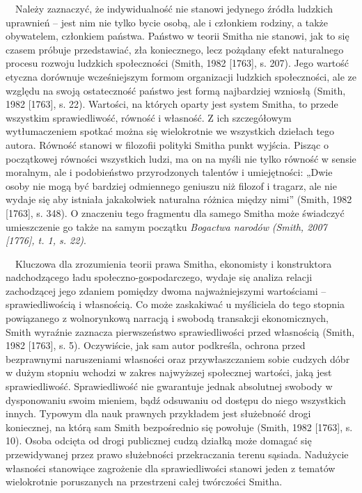 \documentclass[a4paper]{article}
\begin{document}
 \ \ Należy zaznaczyć, że indywidualność nie stanowi jedynego źródła ludzkich uprawnień – jest nim nie tylko bycie
osobą, ale i członkiem rodziny, a także obywatelem, członkiem państwa. Państwo w teorii Smitha nie stanowi, jak to się
czasem próbuje przedstawiać, zła koniecznego, lecz pożądany efekt naturalnego procesu rozwoju ludzkich społeczności
\label{ref:RNDLLHqgagP0f}(Smith, 1982 [1763], s. 207). Jego wartość etyczna dorównuje wcześniejszym formom organizacji
ludzkich społeczności, ale ze względu na swoją ostateczność państwo jest formą najbardziej wzniosłą
\label{ref:RNDKABNqSVWe4}(Smith, 1982 [1763], s. 22). Wartości, na których oparty jest system Smitha, to przede
wszystkim sprawiedliwość, równość i własność. Z ich szczegółowym wytłumaczeniem spotkać można się wielokrotnie we
wszystkich dziełach tego autora. Równość stanowi w filozofii polityki Smitha punkt wyjścia. Pisząc o początkowej
równości wszystkich ludzi, ma on na myśli nie tylko równość w sensie moralnym, ale i podobieństwo przyrodzonych
talentów i umiejętności: „Dwie osoby nie mogą być bardziej odmiennego geniuszu niż filozof i tragarz, ale nie wydaje
się aby istniała jakakolwiek naturalna różnica między nimi” \label{ref:RNDlX5tlrl30w}(Smith, 1982 [1763], s. 348). O
znaczeniu tego fragmentu dla samego Smitha może świadczyć umieszczenie go także na samym początku \textit{Bogactwa
narodów }\label{ref:RNDeavcgj1oLe}\textit{(Smith, 2007 [1776], t. 1, s. 22)}.

\ \ Kluczowa dla zrozumienia teorii prawa Smitha, ekonomisty i konstruktora nadchodzącego ładu społeczno-gospodarczego,
wydaje się analiza relacji zachodzącej jego zdaniem pomiędzy dwoma najważniejszymi wartościami – sprawiedliwością i
własnością. Co może zaskakiwać u myśliciela do tego stopnia powiązanego z wolnorynkową narracją i swobodą transakcji
ekonomicznych, Smith wyraźnie zaznacza pierwszeństwo sprawiedliwości przed własnością \label{ref:RNDOpWvKBrvEq}(Smith,
1982 [1763], s. 5). Oczywiście, jak sam autor podkreśla, ochrona przed bezprawnymi naruszeniami własności oraz
przywłaszczaniem sobie cudzych dóbr w dużym stopniu wchodzi w zakres najwyższej społecznej wartości, jaką jest
sprawiedliwość. Sprawiedliwość nie gwarantuje jednak absolutnej swobody w dysponowaniu swoim mieniem, bądź odsuwaniu od
dostępu do niego wszystkich innych. Typowym dla nauk prawnych przykładem jest służebność drogi koniecznej, na którą sam
Smith bezpośrednio się powołuje \label{ref:RNDA439GNDamV}(Smith, 1982 [1763], s. 10). Osoba odcięta od drogi publicznej
cudzą działką może domagać się przewidywanej przez prawo służebności przekraczania terenu sąsiada. Nadużycie własności
stanowiące zagrożenie dla sprawiedliwości stanowi jeden z tematów wielokrotnie poruszanych na przestrzeni całej
twórczości Smitha.
\end{document}
